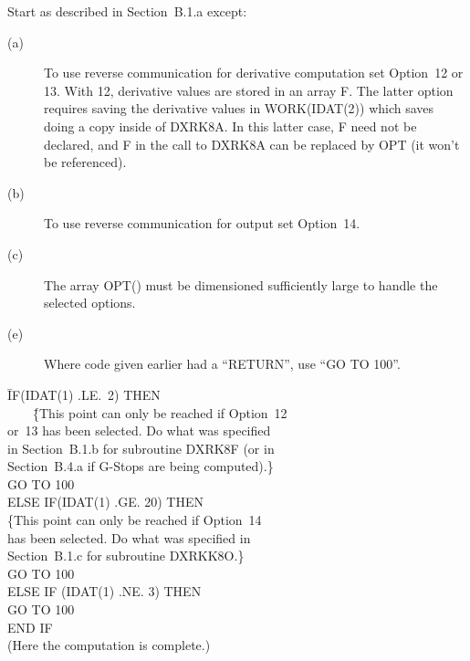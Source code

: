 \documentclass[twoside]{MATH77}
\begin{document}
Start as described in Section~B.1.a except:\vspace{-10pt}
\begin{description}
\item[\rm (a)]  To use reverse communication for derivative computation set
Option~12 or 13.  With 12, derivative values are stored in an array F.
The latter option requires saving the derivative values in WORK(IDAT(2))
which saves doing a copy inside of DXRK8A.  In this latter case, F need
not be declared, and F in the call to DXRK8A can be replaced by OPT (it
won't be referenced).
\item[\rm (b)]  To use reverse communication for output set Option~14.
\item[\rm (c)]  The array OPT() must be dimensioned sufficiently large to
handle the selected options.
\item[\rm (e)]  Where code given earlier had a ``RETURN'', use ``GO TO
100''.
\end{description} \vspace{5pt}

\begin{tabbing}
\phantom{100 }\=IF(IDAT(1) .LE.\ 2) THEN\\
\>\ \ \ \ \=\{This point can only be reached if Option~12 \\
\>\>or~13 has been selected. Do what was specified\\
\>\>in Section\ B.1.b for subroutine DXRK8F (or in\\
\>\>Section~B.4.a if G-Stops are being computed).\}\\
\>\>GO TO 100\\
\>ELSE IF(IDAT(1) .GE. 20) THEN\\
\>\>\{This point can only be reached if Option~14\\
\>\>has been selected. Do what was specified in\\
\>\>Section\ B.1.c for subroutine DXRKK8O.\}\\
\>\>GO TO 100\\
\>ELSE IF (IDAT(1) .NE. 3) THEN\\
\>\>GO TO 100\\
\>END IF\\
\>(Here the computation is complete.)
\end{tabbing}
\end{document}

